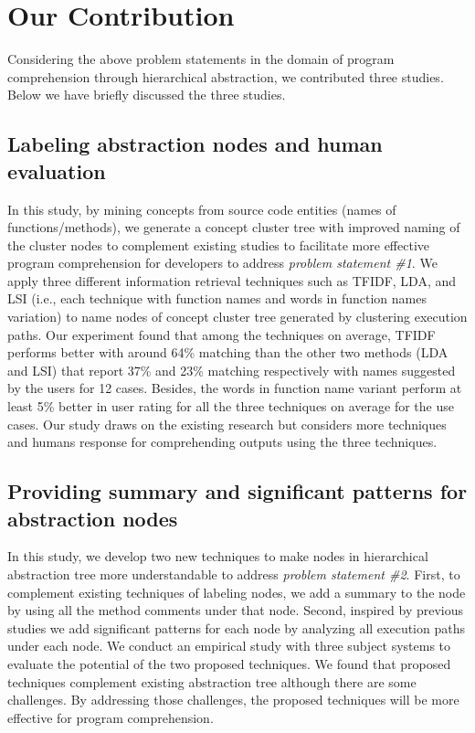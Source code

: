 \section{Our Contribution}
Considering the above problem statements in the domain of program comprehension through hierarchical abstraction, we contributed three studies. Below we have briefly discussed the three studies.  

\subsection{Labeling abstraction nodes and human evaluation}

In this study, by mining concepts from source code entities (names of functions/methods), we generate a concept cluster tree
with improved naming of the cluster nodes to complement existing studies to facilitate more effective program comprehension for
developers to address \emph{problem statement \#1}. We apply three different information retrieval techniques such as TFIDF, LDA, and LSI (i.e., each technique with function
names and words in function names variation) to name nodes of concept cluster tree generated by clustering execution paths. Our experiment found that among the techniques on average, TFIDF performs better with around 64\% matching than the other
two methods (LDA and LSI) that report 37\% and 23\% matching respectively with names suggested by the users for 12 cases. Besides,
the words in function name variant perform at least 5\% better in user rating for all the three techniques on average for the use cases.
Our study draws on the existing research but considers more techniques and humans response for comprehending outputs using the three
techniques.

\subsection{Providing summary and significant patterns for abstraction nodes}

In this study, we develop two new techniques to make nodes in hierarchical abstraction tree more understandable to address \emph{problem statement \#2}. First, to complement existing techniques of labeling nodes, we add a summary to the node by using all the method comments under that node. Second, inspired by previous studies we add significant patterns for each node by analyzing all execution paths under each node. We conduct an empirical study with three subject systems to evaluate the potential of the two proposed techniques. We found that proposed techniques complement existing abstraction tree although there are some challenges. By addressing those challenges, the proposed techniques will be more effective for program comprehension. 

